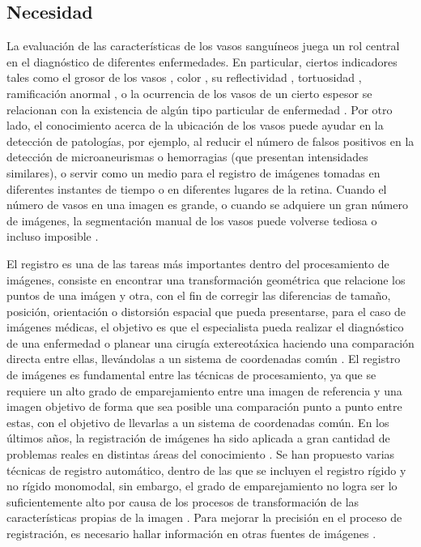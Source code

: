 \subsection{Necesidad}
La evaluaci\'on de las caracter\'isticas de los vasos sangu\'ineos  juega un  rol central en el diagn\'ostico de diferentes enfermedades. En particular, ciertos indicadores tales como el grosor de los vasos \cite{wong2004prospective} \cite{hubbard1999methods} \cite{niemeijer2010automatic}, color \cite{chaudhuri1989detection}, su reflectividad \cite{beach1999oximetry}, tortuosidad \cite{hart1999measurement} \cite{heneghan2002characterization} \cite{capowski1995numeric}, ramificaci\'on anormal \cite{chutatape1998retinal}, o la ocurrencia de los vasos de un cierto espesor  se relacionan con la existencia de algún tipo particular de enfermedad \cite{sinthanayothin1999automated} \cite{martinez2007segmentation}.
Por otro lado, el conocimiento acerca de la ubicación de los vasos puede ayudar en la detección de patologías, por ejemplo, al reducir el número de falsos positivos en la detección de microaneurismas o hemorragias (que presentan intensidades similares), o servir como un medio para el registro de imágenes tomadas en diferentes instantes de tiempo o en diferentes lugares de la retina.\cite{staal2004ridge} Cuando el n\'umero de vasos en una imagen es grande, o cuando se adquiere un gran n\'umero de im\'agenes, la segmentaci\'on manual de los vasos puede volverse tediosa o incluso imposible \cite{jimenez2012automated}.

El registro es una de las tareas m\'as importantes dentro del procesamiento de im\'agenes, consiste en encontrar una transformaci\'on geom\'etrica que relacione los puntos de una im\'agen y otra, con el fin de corregir las diferencias de tamaño, posici\'on, orientaci\'on o distorsi\'on espacial que pueda presentarse, para el caso de im\'agenes m\'edicas, el objetivo es que el especialista pueda realizar el diagn\'ostico de una enfermedad o planear una cirug\'ia extereot\'axica haciendo una comparaci\'on directa entre ellas, llev\'andolas a un sistema de coordenadas com\'un \cite{velez2014metodologia}.
El registro de im\'agenes es fundamental entre las t\'ecnicas de procesamiento, ya que se requiere un alto grado de emparejamiento entre una imagen de referencia y una imagen objetivo de forma que sea posible una comparaci\'on punto a punto entre estas, con el objetivo de llevarlas a un sistema de coordenadas com\'un. En los \'ultimos años, la registraci\'on de im\'agenes ha sido aplicada a gran cantidad de problemas reales en distintas \'areas del conocimiento \cite{zitova2003image} \cite{pluim2003image}. Se han propuesto varias t\'ecnicas de registro autom\'atico, dentro de las que se incluyen el registro r\'igido y no r\'igido monomodal, sin embargo, el grado de emparejamiento no logra ser lo suficientemente alto por causa de los procesos de transformaci\'on de las caracter\'isticas propias de la imagen \cite{hill2001medical} \cite{rueckert2010nonrigid}. Para mejorar la precisi\'on en el proceso de registraci\'on, es necesario hallar informaci\'on en otras fuentes de im\'agenes \cite{velez2014metodologia}.

